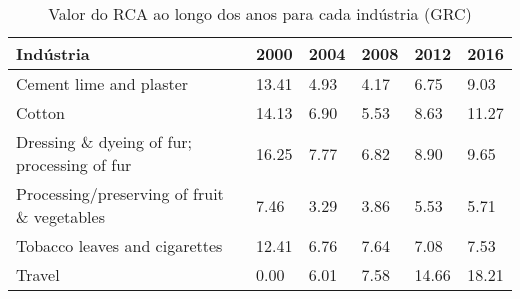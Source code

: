 \begin{table}
\centering
\caption{Valor do RCA ao longo dos anos para cada indústria (GRC)}
\label{tab:ex3-tempo-GRC}
\begin{tabular}{p{6cm}p{1.5cm}p{1.5cm}p{1.5cm}p{1.5cm}p{1.5cm}}
\toprule
                                  Indústria &  2000 & 2004 & 2008 &  2012 &  2016 \\
\midrule
                    Cement lime and plaster & 13.41 & 4.93 & 4.17 &  6.75 &  9.03 \\
                                     Cotton & 14.13 & 6.90 & 5.53 &  8.63 & 11.27 \\
Dressing \& dyeing of fur; processing of fur & 16.25 & 7.77 & 6.82 &  8.90 &  9.65 \\
Processing/preserving of fruit \& vegetables &  7.46 & 3.29 & 3.86 &  5.53 &  5.71 \\
              Tobacco leaves and cigarettes & 12.41 & 6.76 & 7.64 &  7.08 &  7.53 \\
                                     Travel &  0.00 & 6.01 & 7.58 & 14.66 & 18.21 \\
\bottomrule
\end{tabular}
\end{table}

